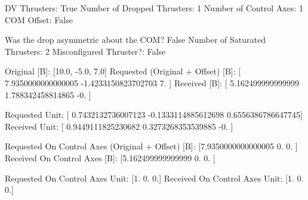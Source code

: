 DV Thrusters:	True
Number of Dropped Thrusters:	1
Number of Control Axes:	1
COM Offset:	False

Was the drop asymmetric about the COM?	False
Number of Saturated Thrusters:	2
Misconfigured Thruster?:	False

Original [B]:	[10.0, -5.0, 7.0]
Requested (Original + Offset) [B]:	[ 7.9350000000000005 -1.4233150823702703  7.                ]
Received [B]:		[ 5.162499999999999  1.788342458814865 -0.               ]

Requested Unit:		[ 0.7432132736007123 -0.1333114885612698  0.6556386786647745]
Received Unit:		[ 0.9449111825230682  0.3273268353539885 -0.                ]

Requested On Control Axes (Original + Offset) [B]:	[7.9350000000000005 0.                 0.                ]
Received On Control Axes [B]:		[5.162499999999999 0.                0.               ]

Requested On Control Axes Unit:		[1. 0. 0.]
Received On Control Axes Unit:		[1. 0. 0.]

